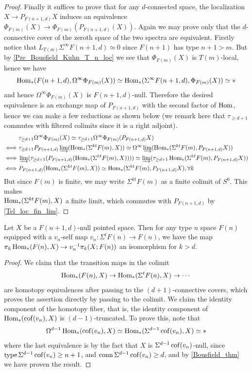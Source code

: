 \begin{proof}
		Finally it suffices to prove that for any $d$-connected space, the localization $X\to P_{F(n+1,d)}X$ induces an equivalence $\Phi_{F(m)}(X)\to\Phi_{F(m)}(P_{F(n+1,d)}(X))$. Again we may prove only that the $d$-connective cover of the zeroth space of the two spectra are equivalent. Firstly notice that $L_{T(m)}\Sigma^\infty F(n+1,d)\simeq0$ since $F(n+1)$ has type $n+1>m$. But by \cref{Pre_Bousfield_Kuhn_T_n_loc} we see that $\Phi_{F(m)}(X)$ is $T(m)$-local, hence we have 
		\[ \operatorname{\mathrm{Hom}}_*(F(n+1,d),\Omega^\infty\Phi_{F(m)}(X))\simeq\operatorname{\mathrm{Hom}}_*(\Sigma^\infty F(n+1,d),\Phi_{F(m)}(X))\simeq* \]
		and hence $\Omega^\infty\Phi_{F(m)}(X)$ is $F(n+1,d)$-null. Therefore the desired equivalence is an exchange map of $P_{F(n+1,d)}$ with the second factor of $\operatorname{\mathrm{Hom}}$, hence we can make a few reductions as shown below (we remark here that $\tau_{\geq d+1}$ commutes with filtered colimits since it is a right adjoint). 
		\begin{align*}
			&\tau_{\geq d+1}\Omega^\infty\Phi_{F(m)}(X)\simeq\tau_{\geq d+1}\Omega^\infty\Phi_{F(m)}(P_{F(n+1,d)}X) \\
			\iff&\tau_{\geq d+1}P_{F(n+1,d)}\varinjlim(\operatorname{\mathrm{Hom}}_*(\Sigma^{kt}F(m),X))\simeq\Omega^\infty\varinjlim(\operatorname{\mathrm{Hom}}_*(\Sigma^{kt}F(m),P_{F(n+1,d)}X)) \\
			\iff&\varinjlim(\tau_{\geq d+1}(P_{F(n+1,d)}(\operatorname{\mathrm{Hom}}_*(\Sigma^{kt}F(m),X))))\simeq\varinjlim(\tau_{\geq d+1}\operatorname{\mathrm{Hom}}_*(\Sigma^{kt}F(m),P_{F(n+1,d)}X)) \\
			\iff&P_{F(n+1,d)}(\operatorname{\mathrm{Hom}}_*(\Sigma^{kt}F(m),X))\simeq\operatorname{\mathrm{Hom}}_*(\Sigma^{kt}F(m),P_{F(n+1,d)}X),\forall k
		\end{align*}
		But since $F(m)$ is finite, we may write $\Sigma^{kt}F(m)$ as a finite colimit of $S^0$. This makes \\
		$\operatorname{\mathrm{Hom}}_*(\Sigma^{kt}F(m),X)$ a finite limit, which commutes with $P_{F(n+1,d)}$ by \cref{Tel_loc_fin_lim}. 
	\end{proof}

	\begin{prop}\label{Periodic_homotopy_grp_equiv_d_conn}
		Let $X$ be a $F(n+1,d)$-null pointed space. Then for any type $n$ space $F(n)$ equipped with a $v_n$-self map $v_n:\Sigma^tF(n)\to F(n)$, we have the map $\pi_k\operatorname{\mathrm{Hom}}_*(F(n),X)\to v_n^{-1}\pi_k(X;F(n))$ an isomorphism for $k>d$. 
	\end{prop}
	\begin{proof}
		We claim that the transition maps in the colimit 
		\[ \operatorname{\mathrm{Hom}}_*(F(n),X)\to\operatorname{\mathrm{Hom}}_*(\Sigma^tF(n),X)\to\cdots \]
		are homotopy equivalences after passing to the $(d+1)$-connective covers, which proves the assertion directly by passing to the colimit. We claim the identity component of the homotopy fiber, that is, the identity component of $\operatorname{\mathrm{Hom}}_*(\operatorname{\mathrm{cof}}(v_n),X)$ is $(d-1)$-truncated. To prove this, note that 
		\[ \Omega^{d-1}\operatorname{\mathrm{Hom}}_*(\operatorname{\mathrm{cof}}(v_n),X)\simeq\operatorname{\mathrm{Hom}}_*(\Sigma^{d-1}\operatorname{\mathrm{cof}}(v_n),X)\simeq* \]
		where the last equivalence is by the fact that $X$ is $\Sigma^{d-1}\operatorname{\mathrm{cof}}(v_n)$-null, since $\operatorname{\mathrm{type}}\Sigma^{d-1}\operatorname{\mathrm{cof}}(v_n)\geq n+1$, and $\operatorname{\mathrm{conn}}\Sigma^{d-1}\operatorname{\mathrm{cof}}(v_n)\geq d$, and by \cref{Bousfield_thm} we have proven the result. 
	\end{proof}

